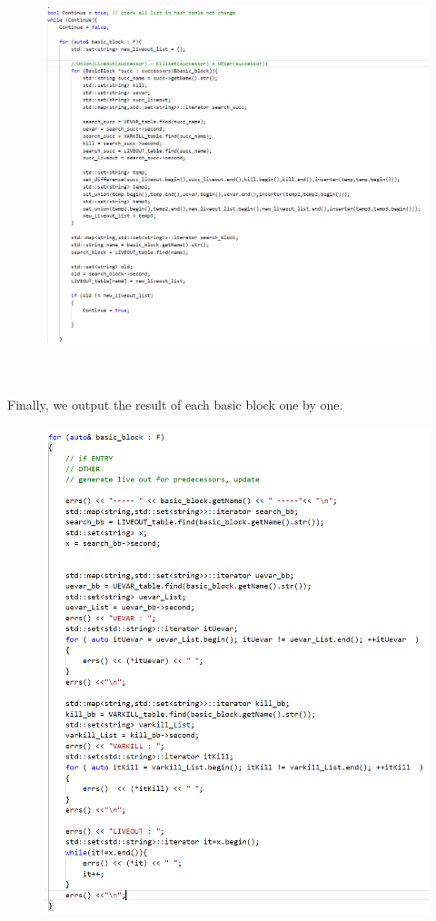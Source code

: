 \documentclass{article}[12pt]
\begin{document}
\begin{figure}[H]
	\centering
	\includegraphics[width=0.7\linewidth]{3}
\end{figure}
\\\\
Finally, we output the result of each basic block one by one.
\begin{figure}[H]
	\centering
	\includegraphics[width=0.7\linewidth]{4}
\end{figure}
\end{document}
